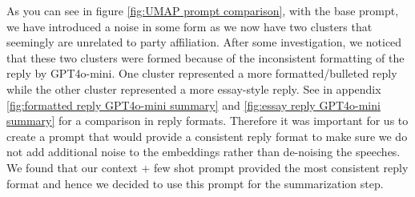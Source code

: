 \documentclass[final,5p,times,twocolumn,authoryear]{elsarticle}
\begin{document}
As you can see in figure \ref{fig:UMAP prompt comparison}, with the base prompt, we have introduced a noise in some form as we now have two clusters that seemingly are unrelated to party affiliation. After some investigation, we noticed that these two clusters were formed because of the inconsistent formatting of the reply by GPT4o-mini. One cluster represented a more formatted/bulleted reply while the other cluster represented a more essay-style reply. See in appendix \ref{fig:formatted reply GPT4o-mini summary} and \ref{fig:essay reply GPT4o-mini summary} for a comparison in reply formats. Therefore it was important for us to create a prompt that would provide a consistent reply format to make sure we do not add additional noise to the embeddings rather than de-noising the speeches. We found that our context + few shot prompt provided the most consistent reply format and hence we decided to use this prompt for the summarization step.
\end{document}
